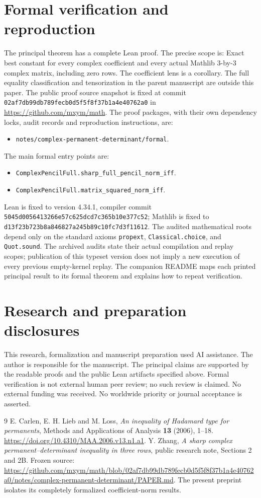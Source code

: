 \documentclass[11pt]{article}
\begin{document}
\section{Formal verification and reproduction}
The principal theorem has a complete Lean proof. The precise scope is:
Exact best constant for every complex coefficient and every actual Mathlib 3-by-3 complex matrix, including zero rows. The coefficient lens is a corollary. The full equality classification and tensorization in the parent manuscript are outside this paper.
The public proof source snapshot is fixed at commit
\nolinkurl{02af7db99db789fecb0d5f5f8f37b1a4e40762a0} in \url{https://github.com/mxym/math}.
The proof packages, with their own dependency locks, audit records and
reproduction instructions, are:
\begin{itemize}
\item \nolinkurl{notes/complex-permanent-determinant/formal}.
\end{itemize}
The main formal entry points are:
\begin{itemize}
\item \nolinkurl{ComplexPencilFull.sharp_full_pencil_norm_iff}.
\item \nolinkurl{ComplexPencilFull.matrix_squared_norm_iff}.
\end{itemize}
Lean is fixed to version 4.34.1, compiler commit
\nolinkurl{5045d0056413266e57c625dcd7c365b10e377c52}; Mathlib is fixed to
\nolinkurl{d13f23b723b8a846827a245b89c10fc7d3f11612}.
The audited mathematical roots depend only on the standard axioms
\texttt{propext}, \texttt{Classical.choice}, and \texttt{Quot.sound}.
The archived audits state their actual compilation and replay scopes;
publication of this typeset version does not imply a new execution of every
previous empty-kernel replay. The companion README maps each printed
principal result to its formal theorem and explains how to repeat verification.

\section*{Research and preparation disclosures}
This research, formalization and manuscript preparation used AI assistance.
The author is responsible for the manuscript. The principal claims are
supported by the readable proofs and the public Lean artifacts specified
above. Formal verification is not external human peer review; no such review
is claimed. No external funding was received. No worldwide priority or
journal acceptance is asserted.
\begin{thebibliography}{9}
 E. Carlen, E. H. Lieb and M. Loss,
\emph{An inequality of Hadamard type for permanents},
Methods and Applications of Analysis \textbf{13} (2006), 1--18.
\url{https://doi.org/10.4310/MAA.2006.v13.n1.a1}.
 Y. Zhang, \emph{A sharp complex permanent--determinant
inequality in three rows}, public research note, Sections 2 and 2B.
Frozen source: \url{https://github.com/mxym/math/blob/02af7db99db789fecb0d5f5f8f37b1a4e40762a0/notes/complex-permanent-determinant/PAPER.md}.
The present preprint isolates its completely formalized coefficient-norm results.
\end{thebibliography}
\end{document}
